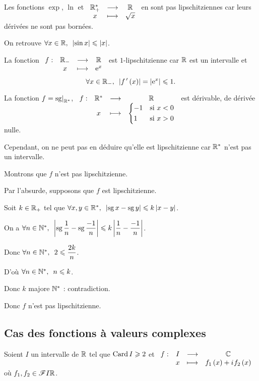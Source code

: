 \begin{ex}
Les fonctions \(\exp\), \(\ln\) et \(\begin{array}[t]{ccc}\mathbb{R}_+^* & \longrightarrow & \mathbb{R} \\ x & \longmapsto & \sqrt{x}\end{array}\) en sont pas lipschitziennes car leurs dérivées ne sont pas bornées.
\end{ex}

\begin{ex}
On retrouve \(\quantifs{\forall x\in\R}\abs{\sin x}\leq\abs{x}\).
\end{ex}

\begin{ex}
La fonction \(\begin{array}[t]{cccc}f : & \mathbb{R}_- & \longrightarrow & \mathbb{R} \\ & x & \longmapsto & \mathrm{e}^{x}\end{array}\) est \(1\)-lipschitzienne car \(\mathbb{R}\) est un intervalle et \[\quantifs{\forall x\in\Rm}\abs{f\prim\paren{x}}=\abs{\e{x}}\leq1.\]
\end{ex}

\begin{ex}
La fonction \(f=\restr{\sg}{\Rs}\), \cad \(\begin{array}[t]{cccc}f : & \mathbb{R}^* & \longrightarrow & \mathbb{R} \\ & x & \longmapsto & \begin{dcases}-1 &\text{si }x<0 \\ 1 &\text{si }x>0\end{dcases}\end{array}\) est dérivable, de dérivée nulle.

Cependant, on ne peut pas en déduire qu'elle est lipschitzienne car \(\mathbb{R}^*\) n'est pas un intervalle.

Montrons que \(f\) n'est pas lipschitzienne.

Par l'absurde, supposons que \(f\) est lipschitzienne.

Soit \(k\in\mathbb{R}_+\) tel que \(\quantifs{\forall x,y\in\Rs}\abs{\sg x-\sg y}\leq k\abs{x-y}\).

On a \(\quantifs{\forall n\in\Ns}\abs{\sg\dfrac{1}{n}-\sg\dfrac{-1}{n}}\leq k\abs{\dfrac{1}{n}-\dfrac{-1}{n}}\).

Donc \(\quantifs{\forall n\in\Ns}2\leq\dfrac{2k}{n}\).

D'où \(\quantifs{\forall n\in\Ns}n\leq k\).

Donc \(k\) majore \(\mathbb{N}^*\) : contradiction.

Donc \(f\) n'est pas lipschitzienne.
\end{ex}

\subsection{Cas des fonctions à valeurs complexes}

Soient \(I\) un intervalle de \(\mathbb{R}\) tel que \(\operatorname{Card} I\geqslant2\) et \(\begin{array}[t]{cccc}f : & I & \longrightarrow & \mathbb{C} \\ & x & \longmapsto & f_1\left(x\right)+i\mkern1mu f_2\left(x\right)\end{array}\) où \(f_1,f_2\in\mathscr{F}{I}{\mathbb{R}}\).

